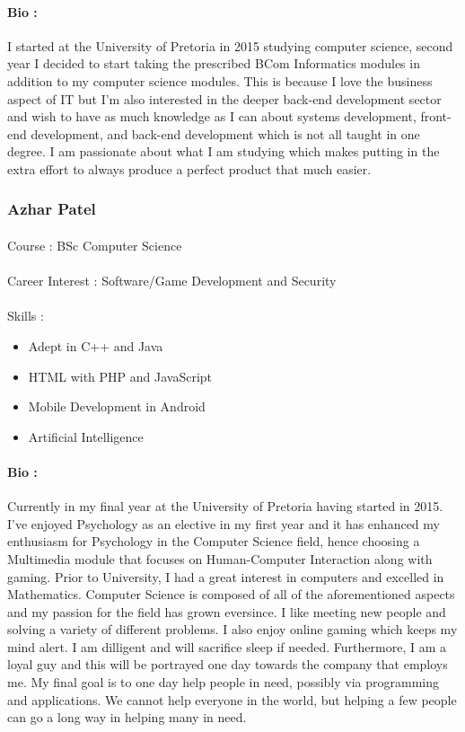 \documentclass[11pt]{article}
\begin{document}
\paragraph{Bio :}I started at the University of Pretoria in 2015 studying computer science, second year I  decided to start taking the prescribed BCom Informatics modules in addition to my computer science modules. This is because I love the business aspect of IT but I'm also interested in the deeper back-end development sector and wish to have as much knowledge as I can about systems development, front-end development, and back-end development which is not all taught in one degree. I am passionate about what I am studying which makes putting in the extra effort to always produce a perfect product that much easier. 

\subsubsection{Azhar Patel}
\paragraph{}Course : BSc Computer Science
\paragraph{}Career Interest : Software/Game Development and Security
\paragraph{}Skills : 
\begin{itemize}
\item Adept in C++ and Java
\item HTML with PHP and JavaScript
\item Mobile Development in Android
\item Artificial Intelligence 
\end{itemize}
\paragraph{Bio :}Currently in my final year at the University of Pretoria having started in 2015. I've enjoyed Psychology as an elective in my first year and it has enhanced my enthusiasm for Psychology in the Computer Science field, hence choosing a Multimedia module that focuses on Human-Computer Interaction along with gaming. Prior to University, I had a great interest in computers and excelled in Mathematics. Computer Science is composed of all of the aforementioned aspects and my passion for the field has grown eversince. I like meeting new people and solving a variety of different problems. I also enjoy online gaming which keeps my mind alert. I am dilligent and will sacrifice sleep if needed. Furthermore, I am a loyal guy and this will be portrayed one day towards the company that employs me. My final goal is to one day help people in need, possibly via programming and applications. We cannot help everyone in the world, but helping a few people can go a long way in helping many in need.
\end{document}
